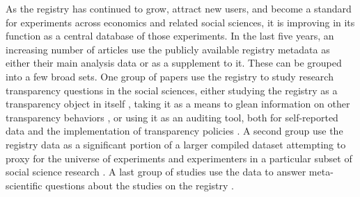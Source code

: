As the registry has continued to grow, attract new users, and become a standard for experiments across economics and related social sciences, it is improving in its function as a central database of those experiments. In the last five years, an increasing number of articles  use the publicly available registry metadata as either their main analysis data or as a supplement to it. These can be grouped into a few broad sets.  
%
%
%
One group of papers use the registry to study research transparency questions in the social sciences, either studying the registry as a transparency object in itself \citep{christensen_transparency_2018,abrams_research_2020,miguel_evidence_2021}, taking it as a means to glean information on other transparency behaviors \citep{ofosu_pre-analysis_2019,laitin_reporting_2021}, or  using it as an auditing tool, both for self-reported data \citep{christensen_open_2019} and the implementation of transparency policies \citep{buckley_role_2022}. A second group use the registry data as a significant portion of a larger compiled dataset attempting to proxy for the universe of experiments and experimenters in a particular subset of social science research \citep{corduneanu-huci_politics_2021,corduneanu-huci_what_2022}. A last group of studies use the data to answer meta-scientific questions about the studies on the registry \citep{leight_publication_2022,murtagh-white_learning_2023}.
